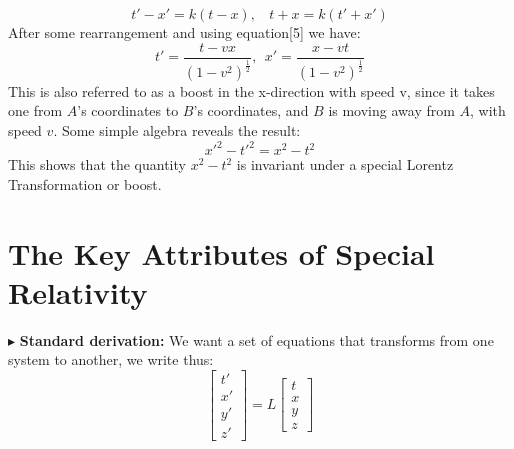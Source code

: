 \documentclass[10pt,a4paper,twocolumn]{article}
\newcommand{\newpoint}[1]{\indent$\blacktriangleright$ \textbf{#1}}
\begin{document}
                \begin{equation}
                    t'-x' = k(t-x) , \ \ \ \ t+x = k(t'+x')
                \end{equation}
                After some rearrangement and using equation[5] we have:
                \begin{equation}
                    t' = \frac{t-vx}{(1-v^2)^{\frac12}}, \ \ x' = \frac{x-vt}{(1-v^2)^{\frac12}}
                \end{equation}
                This is also referred to as a boost in the x-direction with speed v, since it takes one from $A$'s coordinates to $B$'s coordinates, and $B$ is moving away from $A$, with speed $v$. Some simple algebra reveals the result:
                \begin{equation}
                    x'^{2}-t'^{2} = x^2-t^2
                \end{equation} 
                This shows that the quantity $x^2-t^2$ is invariant under a special Lorentz Transformation or boost.

            \section{The Key Attributes of Special Relativity}
                \newpoint{Standard derivation:} We want a set of equations that transforms from one system to another, we write thus:
                \begin{equation}
                    \begin{bmatrix}
                        t' \\ x' \\ y'\\ z'
                    \end{bmatrix}
                    = L \begin{bmatrix}
                        t \\ x \\ y\\ z
                    \end{bmatrix}
                \end{equation}
                
\end{document}
